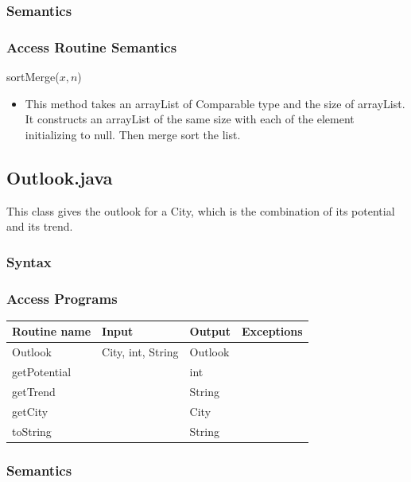 \documentclass[12pt,fleqn]{article}
\begin{document}
\subsubsection*{Semantics}
\subsubsection*{Access Routine Semantics}
\noindent sortMerge($x, n$)
\begin{itemize}
\item This method takes an arrayList of Comparable type and the size of arrayList. It constructs an arrayList of
the same size with each of the element initializing to null. Then merge sort the list.
\end{itemize}


\subsection*{Outlook.java}\label{outlook}
This class gives the outlook for a City, which is the combination of its potential and its trend.
\subsubsection* {Syntax}

\subsubsection* {Access Programs}
\begin{tabular}{| l | l | l | l |}
\hline
\textbf{Routine name} & \textbf{Input} & \textbf{Output} & \textbf{Exceptions}\\
\hline
Outlook & City, int, String & Outlook & ~\\
\hline
getPotential & ~ & int & ~\\
\hline
getTrend & ~ & String & ~\\
\hline
getCity & ~ & City & ~\\
\hline
toString & ~ & String & ~\\
\hline
\end{tabular}

\subsubsection*{Semantics}
\end{document}
